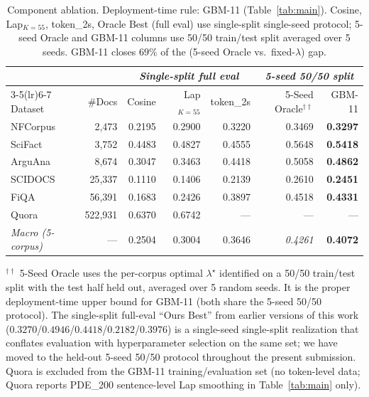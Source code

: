 \documentclass[review,1p]{elsarticle}
\begin{document}
\begin{table}[ht]
\centering
\caption{Component ablation. Deployment-time rule: GBM-11 (Table~\ref{tab:main}). Cosine, Lap$_{K=55}$, token\_2s, Oracle Best (full eval) use single-split single-seed protocol; 5-seed Oracle and GBM-11 columns use 50/50 train/test split averaged over 5 seeds. GBM-11 closes $69\%$ of the (5-seed Oracle vs.\ fixed-$\lambda$) gap.}
\label{tab:ablation-components}
\footnotesize
\begin{tabular}{lr|rrrrr}
\toprule
 & & \multicolumn{3}{c}{\textit{Single-split full eval}} & \multicolumn{2}{c}{\textit{5-seed 50/50 split}} \\
\cmidrule(lr){3-5}\cmidrule(lr){6-7}
Dataset & \#Docs & Cosine & Lap$_{K=55}$ & token\_2s & 5-Seed Oracle$^{\dagger\dagger}$ & GBM-11 \\
\midrule
NFCorpus & 2{,}473 & 0.2195 & 0.2900 & 0.3220 & 0.3469 & \textbf{0.3297} \\
SciFact & 3{,}752 & 0.4483 & 0.4827 & 0.4555 & 0.5648 & \textbf{0.5418} \\
ArguAna & 8{,}674 & 0.3047 & 0.3463 & 0.4418 & 0.5058 & \textbf{0.4862} \\
SCIDOCS & 25{,}337 & 0.1110 & 0.1406 & 0.2139 & 0.2610 & \textbf{0.2451} \\
FiQA & 56{,}391 & 0.1683 & 0.2426 & 0.3897 & 0.4518 & \textbf{0.4331} \\
Quora & 522{,}931 & 0.6370 & 0.6742 & --- & --- & --- \\
\midrule
\textit{Macro (5-corpus)} & --- & 0.2504 & 0.3004 & 0.3646 & \textit{0.4261} & \textbf{0.4072} \\
\bottomrule
\end{tabular}

\vspace{4pt}
{\footnotesize
$^{\dagger\dagger}$ 5-Seed Oracle uses the per-corpus optimal $\lambda^\star$ identified on a 50/50 train/test split with the test half held out, averaged over 5 random seeds. It is the proper deployment-time upper bound for GBM-11 (both share the 5-seed 50/50 protocol). The single-split full-eval ``Ours Best'' from earlier versions of this work ($0.3270$/$0.4946$/$0.4418$/$0.2182$/$0.3976$) is a single-seed single-split realization that conflates evaluation with hyperparameter selection on the same set; we have moved to the held-out 5-seed 50/50 protocol throughout the present submission. Quora is excluded from the GBM-11 training/evaluation set (no token-level data; Quora reports PDE\_200 sentence-level Lap smoothing in Table~\ref{tab:main} only).
}
\end{table}
\end{document}
